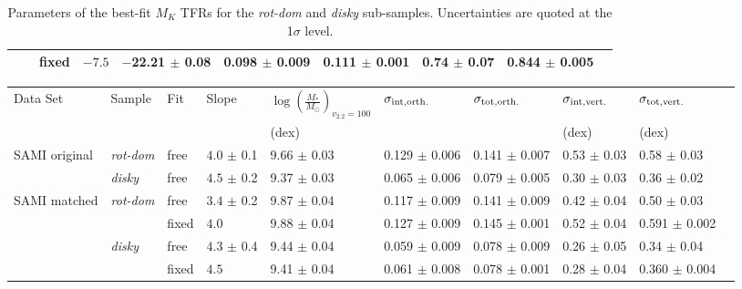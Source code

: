 \documentclass[a4paper,fleqn,usenatbib]{mnras}
\begin{document}
{\begin{table}
\begin{tabular}{ llllllllll}
	    & 			  & fixed & $-7.5$ \phantom{$\pm$} \phantom{0.2} 			 & $-$22.21 $\pm$ 0.08  & 0.098 $\pm$ 0.009  & 0.111 $\pm$ 0.001 & 0.74 $\pm$ 0.07\phantom{0} & 0.844 $\pm$ 0.005 \\%
\hline
\end{tabular}
\caption{Parameters of the best-fit $M_{K}$ TFRs for the \textit{rot-dom} and \textit{disky} sub-samples. Uncertainties are quoted at the 1$\sigma$ level.}
\label{tab:SAMIvsKROSSMKTFR}
\end{table}


\begin{table}
\centering
\begin{tabular}{ llllllllll}
\hline
Data Set & Sample & Fit &Slope & $\log (\frac{M_{*}}{M_{\odot}})_{v_{2.2}=100}$& $\sigma_{\rm{int, orth.}}$ & $\sigma_{\rm{tot, orth.}}$ & $\sigma_{\rm{int, vert.}}$ & $\sigma_{\rm{tot, vert.}}$ \\
		 & 		  &     &      & 	(dex)       &                &                & (dex)              & (dex)              \\
\hline
SAMI original  & \textit{rot-dom}     & free  & $4.0$\phantom{0} $\pm$ 0.1\phantom{0} 			 & \phantom{1}9.66 $\pm$ 0.03 & 0.129 $\pm$ 0.006  					   & 0.141 $\pm$ 0.007 					   & 0.53 $\pm$ 0.03 					   & 0.58\phantom{0} $\pm$ 0.03 \\%
 			   & \textit{disky} & free  & $4.5$\phantom{0} $\pm$ 0.2\phantom{0}  		 & \phantom{1}9.37 $\pm$ 0.03 & 0.065 $\pm$ 0.006  					   & 0.079 $\pm$ 0.005 					   & 0.30 $\pm$ 0.03 					   & 0.36\phantom{0} $\pm$ 0.02 \\%
SAMI matched   & \textit{rot-dom}     & free  & $3.4$\phantom{0} $\pm$ 0.2\phantom{0} 			 & \phantom{1}9.87 $\pm$ 0.04 & 0.117 $\pm$ 0.009    					   & 0.141 $\pm$ 0.009			           & 0.42 $\pm$ 0.04 					   & 0.50\phantom{0} $\pm$ 0.03 \\%
	    	   & 	           & fixed & $4.0$ \phantom{$\pm$} \phantom{0.09} 			 & \phantom{1}9.88 $\pm$ 0.04	& 0.127 $\pm$ 0.009					       & 0.145 $\pm$ 0.001 					   & 0.52 $\pm$ 0.04					   & 0.591			 $\pm$ 0.002 \\%
	           & \textit{disky} & free  & $4.3$\phantom{0} $\pm$ 0.4\phantom{0}  		 & \phantom{1}9.44 $\pm$ 0.04 & 0.059 $\pm$ 0.009    & 0.078 $\pm$ 0.009 				       & 0.26 $\pm$ 0.05 					   & 0.34\phantom{0} $\pm$ 0.04 \\%
	    	   & 			   & fixed & $4.5$\phantom{0} \phantom{$\pm$} \phantom{0.10} & \phantom{1}9.41 $\pm$ 0.04	& 0.061 $\pm$ 0.008					       & 0.078 $\pm$ 0.001 					   & 0.28 $\pm$ 0.04 				       & 0.360 $\pm$ 0.004 \\%

\end{tabular}
\end{table}}
\end{document}
